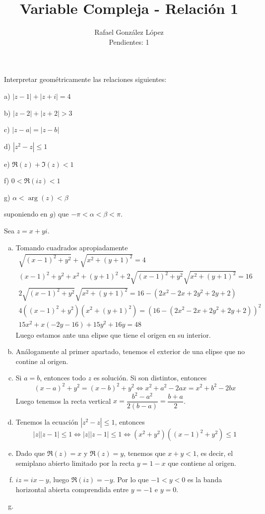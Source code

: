 \documentclass[twoside]{article}
\begin{document}
\title{Variable Compleja - Relación 1}
\author{Rafael González López\\
Pendientes: 1}
\maketitle

\begin{ejercicio}{1}
Interpretar geométricamente las relaciones siguientes:
  \begin{AutoMultiColItemize}
  \item[a)] $|z-1|+|z+i|=4$
  \item[b)] $|z-2|+|z+2|>3$
  \item[c)] $|z-a|=|z-b|$
  \item[d)] $|z^2-z|\leq 1$
  \item[e)] $\Re(z)+\Im(z)<1$
  \item[f)] $0<\Re(iz)<1$
  \item[g)] $\alpha < \arg(z) < \beta$
  \end{AutoMultiColItemize}
suponiendo en $g)$ que $-\pi<\alpha<\beta<\pi$. 
\end{ejercicio}
\begin{solucion}
Sea $z=x+yi$. 
\begin{enumerate}[a)]
\item Tomando cuadrados apropiadamente
\begin{gather*}
\sqrt{(x-1)^2+y^2}+\sqrt{x^2+(y+1)^2}=4\\
(x-1)^2+y^2 + x^2+(y+1)^2 + 2\sqrt{(x-1)^2+y^2}\sqrt{x^2+(y+1)^2} = 16\\
2\sqrt{(x-1)^2+y^2}\sqrt{x^2+(y+1)^2} = 16 - (2 x^2 - 2 x + 2 y^2 + 2 y + 2)\\
4((x-1)^2+y^2)(x^2+(y+1)^2) = (16 - (2 x^2 - 2 x + 2 y^2 + 2 y + 2))^2\\
15 x^2 + x (-2 y - 16) + 15 y^2 + 16 y = 48	
\end{gather*}
Luego estamos ante una elipse que tiene el origen en su interior.
\item Análogamente al primer apartado, tenemos el exterior de una elipse que no contine al origen.
\item Si $a=b$, entonces todo $z$ es solución. Si son distintos, entonces
$$
(x-a)^2+y^2 = (x-b)^2 +y^2  \Leftrightarrow x^2+a^2-2ax = x^2+b^2 -2bx 
$$
Luego tenemos la recta vertical $x = \dfrac{b^2-a^2}{2(b-a)}=\dfrac{b+a}{2}$.
\item Tenemos la ecuación $|z^2-z|\leq 1$, entonces
$$
|z||z-1|\leq 1 \Leftrightarrow |z||z-1| \leq 1 \Leftrightarrow (x^2+y^2)((x-1)^2+y^2) \leq 1
$$
\item Dado que $\Re(z)=x$ y $\Re(z)=y$, tenemos que $x+y<1$, es decir, el semiplano abierto limitado por la recta $y=1-x$ que contiene al origen.
\item $iz= ix-y$, luego $\Re(iz)= -y$. Por lo que $-1<y<0$ es la banda horizontal abierta comprendida entre $y=-1$ e $y=0$.
\item 
\end{enumerate}
\end{solucion}
\end{document}
